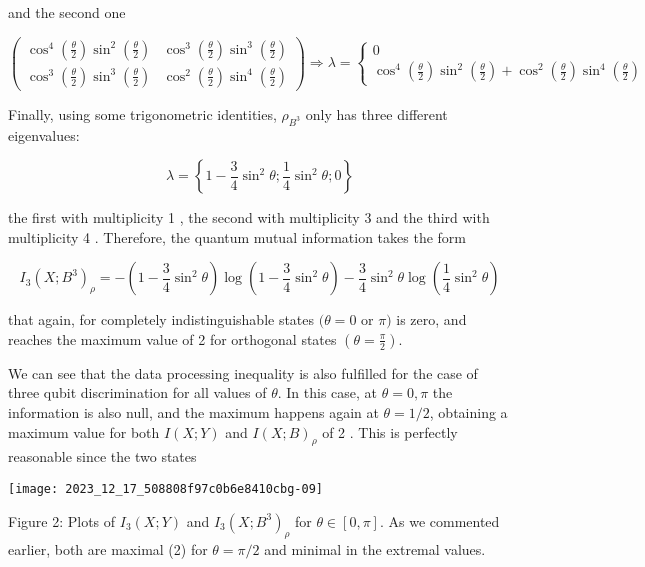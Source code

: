 \documentclass[10]{article}
\begin{document}
and the second one

$$
\left(\begin{array}{ll}
\cos ^{4}\left(\frac{\theta}{2}\right) \sin ^{2}\left(\frac{\theta}{2}\right) & \cos ^{3}\left(\frac{\theta}{2}\right) \sin ^{3}\left(\frac{\theta}{2}\right) \\
\cos ^{3}\left(\frac{\theta}{2}\right) \sin ^{3}\left(\frac{\theta}{2}\right) & \cos ^{2}\left(\frac{\theta}{2}\right) \sin ^{4}\left(\frac{\theta}{2}\right)
\end{array}\right) \Rightarrow \lambda=\left\{\begin{array}{l}
0 \\
\cos ^{4}\left(\frac{\theta}{2}\right) \sin ^{2}\left(\frac{\theta}{2}\right)+\cos ^{2}\left(\frac{\theta}{2}\right) \sin ^{4}\left(\frac{\theta}{2}\right)
\end{array}\right.
$$

Finally, using some trigonometric identities, $\rho_{B^{3}}$ only has three different eigenvalues:

$$
\lambda=\left\{1-\frac{3}{4} \sin ^{2} \theta ; \frac{1}{4} \sin ^{2} \theta ; 0\right\}
$$

the first with multiplicity 1 , the second with multiplicity 3 and the third with multiplicity 4 . Therefore, the quantum mutual information takes the form

$$
I_{3}\left(X ; B^{3}\right)_{\rho}=-\left(1-\frac{3}{4} \sin ^{2} \theta\right) \log \left(1-\frac{3}{4} \sin ^{2} \theta\right)-\frac{3}{4} \sin ^{2} \theta \log \left(\frac{1}{4} \sin ^{2} \theta\right)
$$

that again, for completely indistinguishable states $(\theta=0$ or $\pi)$ is zero, and reaches the maximum value of 2 for orthogonal states $\left(\theta=\frac{\pi}{2}\right)$.

We can see that the data processing inequality is also fulfilled for the case of three qubit discrimination for all values of $\theta$. In this case, at $\theta=0, \pi$ the information is also null, and the maximum happens again at $\theta=1 / 2$, obtaining a maximum value for both $I(X ; Y)$ and $I(X ; B)_{\rho}$ of 2 . This is perfectly reasonable since the two states

\begin{center}
\texttt{[image: 2023\_12\_17\_508808f97c0b6e8410cbg-09]}
\end{center}

Figure 2: Plots of $I_{3}(X ; Y)$ and $I_{3}\left(X ; B^{3}\right)_{\rho}$ for $\theta \in[0, \pi]$. As we commented earlier, both are maximal (2) for $\theta=\pi / 2$ and minimal in the extremal values.
\end{document}
